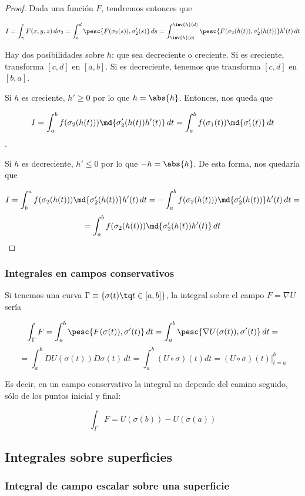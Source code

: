 \documentclass[12pt,a4paper,titlepage]{apuntes}
\begin{document}
\begin{proof}
Dada una función $F$, tendremos entonces que

\[ I = \int_\gamma F(x,y,z)\,d\sigma_2 = \int_c^d \pesc{F(\sigma_2(s)), \sigma_2'(s)}\, ds = \int_{\inv{h}(c)}^{\inv{h}(d)} \pesc{F(\sigma_2(h(t)), \sigma_2'(h(t))} h'(t) \,dt \]

Hay dos posibilidades sobre $h$: que sea decreciente o creciente. Si es creciente, transforma $[c,d]$ en $[a,b]$. Si es decreciente, tenemos que transforma $[c,d]$ en $[b,a]$.

Si $h$ es creciente, $h' ≥ 0$ por lo que $h = \abs{h}$. Entonces, nos queda que 

\[ I = \int_a^bf(\sigma_2(h(t)))\md{\sigma_2'(h(t))h'(t)}\,dt = \int_a^bf(\sigma_1(t))\md{\sigma_1'(t)}\,dt\].

Si $h$ es decreciente, $h' ≤ 0$ por lo que $-h = \abs{h}$. De esta forma, nos quedaría que

\[ I = \int_b^af(\sigma_2(h(t)))\md{\sigma_2'(h(t))}h'(t)\,dt = -\int_a^bf(\sigma_2(h(t)))\md{\sigma_2'(h(t))} h'(t)\,dt =\]\[ = \int_a^bf(\sigma_2(h(t)))\md{\sigma_2'(h(t))h'(t)}\,dt \]
\end{proof}

\subsubsection{Integrales en campos conservativos}

Si tenemos una curva $\Gamma \equiv \{\sigma(t) \tq t \in [a,b]\}$, la integral sobre el campo $F = \nabla U$ sería

\[ \int_\Gamma F = \int_a^b \pesc{F(\sigma(t)),\sigma'(t)}\,dt = \int_a^b \pesc{\nabla U (\sigma(t)),\sigma'(t)}\,dt = \]
\[ = \int_a^bDU(\sigma(t))D\sigma(t)\,dt = \int_a^b (U\circ\sigma)(t)dt = \left.(U\circ\sigma)(t)\right|_{t=a}^b \]

Es decir, en un campo conservativo la integral no depende del camino seguido, sólo de los puntos inicial y final:

\[ \int_\Gamma F = U(\sigma(b)) - U(\sigma(a)) \]

\subsection{Integrales sobre superficies}

\subsubsection{Integral de campo escalar sobre una superficie}
\end{document}
